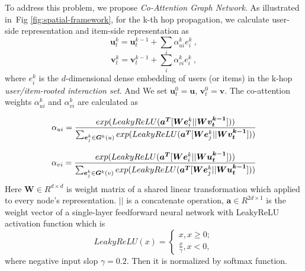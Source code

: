 To address this problem, we propose \textit{Co-Attention Graph Network}. As illustrated in~Fig \ref{fig:spatial-framework}, for the k-th hop propagation, we calculate user-side representation and item-side representation as
\begin{equation}
\bm{u}_t^k = \bm{u}_t^{k-1} + \sum_i \alpha_{ui}^k e_i^k ~,
\end{equation}
\begin{equation}
\bm{v}_t^k = \bm{v}_t^{k-1} + \sum_i \alpha_{vi}^k e_i^k ~,
\end{equation}
where $e_i^k$ is the $d$-dimensional dense embedding of users (or items) in the k-hop \textit{user/item-rooted interaction set}. And We set $\bm{u}_t^0 = \bm{u}$, $\bm{v}_t^0 = \bm{v}$. The co-attention weights $\alpha_{ui}^k$ and $\alpha_{vi}^k$ are calculated as

\begin{equation} \label{eq:co_atten_1}
\alpha_{ui} = \frac{exp(LeakyReLU(\bm{a^T}[\bm{We}_i^k||\bm{Wv_t^{k-1}}]))}{\sum_{\bm{e}_j^k \in \bm{G}^k(u)}exp(LeakyReLU(\bm{a^T}[\bm{We}_j^k||\bm{Wv_t^{k-1}}]))}
\end{equation}

\begin{equation}  \label{eq:co_atten_2}
\alpha_{vi} = \frac{exp(LeakyReLU(\bm{a^T}[\bm{We}_i^k||\bm{Wu_t^{k-1}}]))}{\sum_{\bm{e}_j^k \in \bm{G}^k(v)}exp(LeakyReLU(\bm{a^T}[\bm{We}_j^k||\bm{Wu_t^{k-1}}]))}
\end{equation}
Here $\bm{W} \in R^{d \times d}$ is weight matrix of a shared linear transformation which applied to every node's representation. $||$ is a concatenate operation, $\bm{a} \in R^{2d \times 1}$ is the weight vector of a single-layer feedforward neural network with LeakyReLU activation function which is
\begin{equation}
	LeakyReLU(x) = \left\{
		\begin{array}{ccr}
		x, x \geq 0; \\
		\frac{x}{\gamma}, x < 0,
		\end{array}
	\right.
\end{equation}
where negative input slop $\gamma = 0.2$. Then it is normalized by softmax function.

